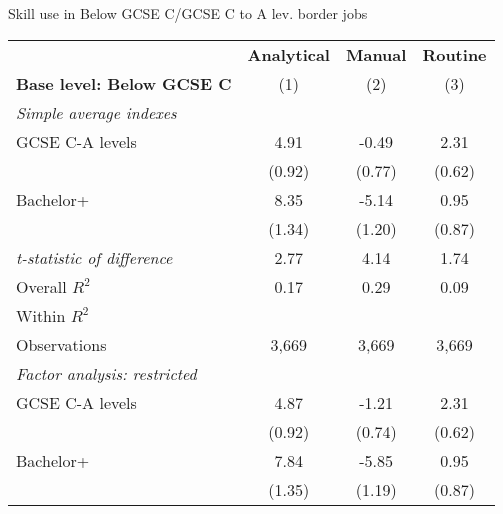 \begin{center}
\begin{threeparttable}[!h]
\caption{Skill use in Below GCSE C/GCSE C to A lev. border jobs}
\label{tab:skillRegs}
\begin{tabular}{lccc}
\toprule
\toprule
&\multicolumn{1}{c}{\textbf{Analytical}}&\multicolumn{1}{c}{\textbf{Manual}}&\multicolumn{1}{c}{\textbf{Routine}} \\
\textbf{Base level: Below GCSE C}&\multicolumn{1}{c}{(1)}&\multicolumn{1}{c}{(2)}&\multicolumn{1}{c}{(3)} \\
\midrule
\textit{Simple average indexes}\vspace{1mm} \\ 
\hspace{3mm}GCSE C-A levels&        4.91\sym{***}&       -0.49         &        2.31\sym{***}\\
                    &      (0.92)         &      (0.77)         &      (0.62)         \\
\hspace{3mm}Bachelor+&        8.35\sym{***}&       -5.14\sym{***}&        0.95         \\
                    &      (1.34)         &      (1.20)         &      (0.87)         \\
\textit{t-statistic of difference}&        2.77         &        4.14         &        1.74         \\
\midrule Overall $ R^2$&        0.17         &        0.29         &        0.09         \\
Within $ R^2$       &                     &                     &                     \\
Observations        &       3,669         &       3,669         &       3,669         \\
\midrule \vspace{1mm}\textit{Factor analysis: restricted} \\ 
\hspace{3mm}GCSE C-A levels&        4.87\sym{***}&       -1.21         &        2.31\sym{***}\\
                    &      (0.92)         &      (0.74)         &      (0.62)         \\
\hspace{3mm}Bachelor+&        7.84\sym{***}&       -5.85\sym{***}&        0.95         \\
                    &      (1.35)         &      (1.19)         &      (0.87)         \\

\end{tabular}
\end{threeparttable}
\end{center}
